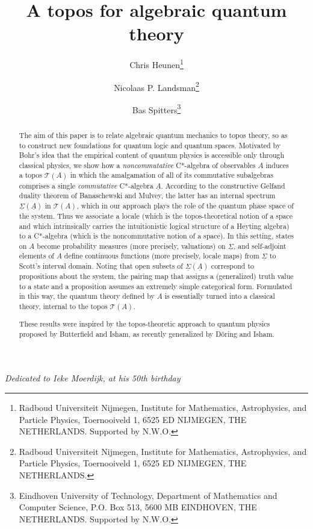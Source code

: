 \documentclass[11pt]{article}
\newcommand{\alg}[1]{\ensuremath{#1}}
\newcommand{\functor}[1]{\ensuremath{\underline{#1}}}
\newcommand{\asstopos}{\ensuremath{\mathcal{T}}}
\newcommand{\uS}{\underline{\Sigma}}
\newcommand{\uA}{\underline{A}}
\newcommand{\TA}{\mathcal{T}(A)}
\newcommand{\ulS}{\functor{\Sigma}}
\renewcommand{\TA}{\asstopos(\alg{A})}
\begin{document}
\title{A topos for algebraic quantum theory}
\author{Chris Heunen\footnote{Radboud Universiteit Nijmegen,
    Institute for Mathematics, Astrophysics, and Particle Physics,
    Toernooiveld 1, 6525 ED NIJMEGEN, THE NETHERLANDS.
    Supported by N.W.O.} \and
  Nicolaas P. Landsman\footnote{Radboud Universiteit Nijmegen,
    Institute for Mathematics, Astrophysics, and Particle Physics,
    Toernooiveld 1, 6525 ED NIJMEGEN, THE NETHERLANDS.} \and
  Bas Spitters\footnote{Eindhoven University of Technology,
    Department of Mathematics and Computer Science, P.O. Box 513, 5600
    MB EINDHOVEN, THE NETHERLANDS. Supported by N.W.O.}}
\maketitle
\vspace*{-0.75cm}
\begin{center}{\it
Dedicated to Ieke Moerdijk, at his 50th birthday}
\end{center}
\smallskip
\begin{abstract}
  The aim of this paper is to relate algebraic quantum mechanics to
  topos theory, so as to construct new foundations for quantum logic
  and quantum spaces. Motivated by Bohr's idea that the empirical
  content of quantum physics is accessible only through classical
  physics, we show how a {\it noncommutative} C*-algebra of observables $A$ induces a
  topos $\TA$ in which the amalgamation of all of its commutative
  subalgebras comprises a single {\it commutative} C*-algebra
  $\uA$. According to the constructive Gelfand duality theorem of
  Banaschewski and Mulvey, the latter has an internal spectrum
  $\ulS(\uA)$ in $\TA$, which in our approach plays the role of the
  quantum phase space  of the system. Thus we associate a locale
  (which is the topos-theoretical notion of a space and which
  intrinsically carries  the intuitionistic logical structure of a
  Heyting algebra) to a  C*-algebra (which is the noncommutative
  notion of a space). In this setting,  states on $A$ become
  probability measures (more precisely, valuations) on $\uS$, and
  self-adjoint elements of $A$ define continuous functions  (more
  precisely, locale maps) from  $\uS$ to Scott's interval
  domain. Noting that open subsets of  $\ulS(\uA)$ correspond to
  propositions about the system, the pairing map that assigns a
  (generalized) truth value to a state and a proposition assumes an
  extremely simple categorical form. Formulated in this way, the
  quantum theory defined by $A$ is essentially turned into a classical
  theory, internal to the topos $\TA$.

  These results were inspired by the topos-theoretic approach to
  quantum physics proposed by Butterfield and Isham, as recently generalized by D\"{o}ring and Isham.
\end{abstract}
\end{document}
